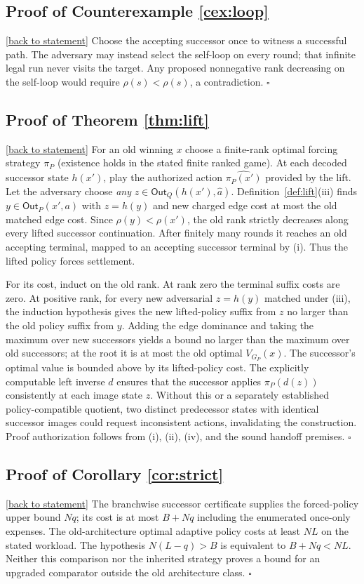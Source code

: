 \documentclass[11pt,letterpaper]{article}
\theoremstyle{definition}
\theoremstyle{remark}
\newcommand{\Out}{\mathsf{Out}}
\newcommand{\backlink}[1]{\hyperlink{claim:#1}{\footnotesize[back to statement]}}
\begin{document}
\hypertarget{proof:loop}{}\subsection*{Proof of Counterexample \ref{cex:loop}}\backlink{loop}
Choose the accepting successor once to witness a successful path. The adversary may instead select the self-loop on every round; that infinite legal run never visits the target. Any proposed nonnegative rank decreasing on the self-loop would require $\rho(s)<\rho(s)$, a contradiction. $\square$

\hypertarget{proof:lift}{}\subsection*{Proof of Theorem \ref{thm:lift}}\backlink{lift}
For an old winning $x$ choose a finite-rank optimal forcing strategy $\pi_P$ (existence holds in the stated finite ranked game). At each decoded successor state $h(x')$, play the authorized action $\widehat{\pi_P(x')}$ provided by the lift. Let the adversary choose \emph{any} $z\in\Out_Q(h(x'),\widehat a)$. Definition~\ref{def:lift}(iii) finds $y\in\Out_P(x',a)$ with $z=h(y)$ and new charged edge cost at most the old matched edge cost. Since $\rho(y)<\rho(x')$, the old rank strictly decreases along every lifted successor continuation. After finitely many rounds it reaches an old accepting terminal, mapped to an accepting successor terminal by (i). Thus the lifted policy forces settlement.

For its cost, induct on the old rank. At rank zero the terminal suffix costs are zero. At positive rank, for every new adversarial $z=h(y)$ matched under (iii), the induction hypothesis gives the new lifted-policy suffix from $z$ no larger than the old policy suffix from $y$. Adding the edge dominance and taking the maximum over new successors yields a bound no larger than the maximum over old successors; at the root it is at most the old optimal $V_{G_P}(x)$. The successor's optimal value is bounded above by its lifted-policy cost. The explicitly computable left inverse $d$ ensures that the successor applies $\pi_P(d(z))$ consistently at each image state $z$. Without this or a separately established policy-compatible quotient, two distinct predecessor states with identical successor images could request inconsistent actions, invalidating the construction. Proof authorization follows from (i), (ii), (iv), and the sound handoff premises. $\square$

\hypertarget{proof:strict}{}\subsection*{Proof of Corollary \ref{cor:strict}}\backlink{strict}
The branchwise successor certificate supplies the forced-policy upper bound $Nq$; its cost is at most $B+Nq$ including the enumerated once-only expenses. The old-architecture optimal adaptive policy costs at least $NL$ on the stated workload. The hypothesis $N(L-q)>B$ is equivalent to $B+Nq<NL$. Neither this comparison nor the inherited strategy proves a bound for an upgraded comparator outside the old architecture class. $\square$
\end{document}
